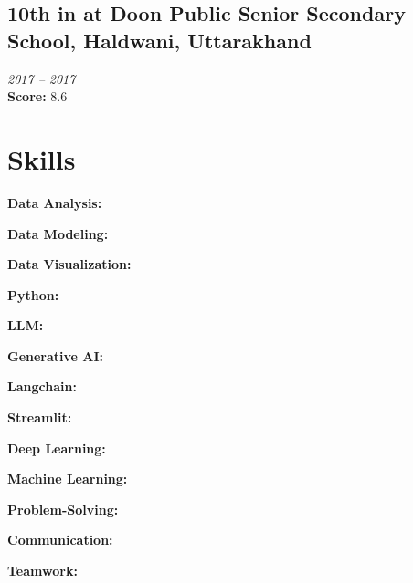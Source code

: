 \documentclass{article}
\begin{document}
\subsection{10th in  at Doon Public Senior Secondary School, Haldwani, Uttarakhand}
\textit{2017 -- 2017}\\
\textbf{Score:} 8.6\\

\section{Skills}
\textbf{Data Analysis:} 

\textbf{Data Modeling:} 

\textbf{Data Visualization:} 

\textbf{Python:} 

\textbf{LLM:} 

\textbf{Generative AI:} 

\textbf{Langchain:} 

\textbf{Streamlit:} 

\textbf{Deep Learning:} 

\textbf{Machine Learning:} 

\textbf{Problem-Solving:} 

\textbf{Communication:} 

\textbf{Teamwork:} 
\end{document}
